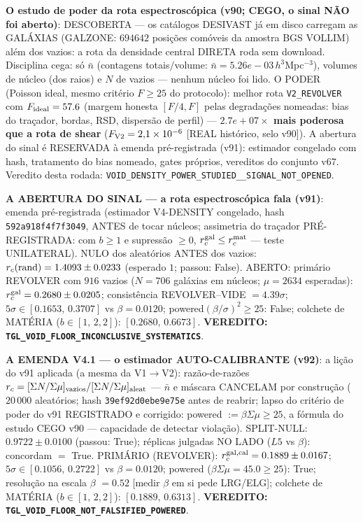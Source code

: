 \documentclass[11pt]{article}
\theoremstyle{definition}\newtheorem{deriv}{Derivação}
\begin{document}
\textbf{O estudo de poder da rota espectroscópica (v90; CEGO, o sinal NÃO foi aberto)}: DESCOBERTA --- os catálogos DESIVAST já em disco carregam as GALÁXIAS (GALZONE: $694642$ posições comóveis da amostra BGS VOLLIM) além dos vazios: a rota da densidade central DIRETA roda sem download. Disciplina cega: só $\bar n$ (contagens totais$/$volume: $\bar n=5.26e-03\,h^3$Mpc$^{-3}$), volumes de núcleo (dos raios) e $N$ de vazios --- nenhum núcleo foi lido. O PODER (Poisson ideal, mesmo critério $F\ge25$ do protocolo): melhor rota \texttt{V2\_REVOLVER} com $F_{\rm ideal}=57.6$ (margem honesta $[F/4,F]$ pelas degradações nomeadas: bias do traçador, bordas, RSD, dispersão de perfil) --- \textbf{$2.7e+07\times$ mais poderosa que a rota de shear} ($F_{\rm V2}=2{,}1\times10^{-6}$ [REAL histórico, selo v90]). A abertura do sinal é RESERVADA à emenda pré-registrada (v91): estimador congelado com hash, tratamento do bias nomeado, gates próprios, vereditos do conjunto v67. Veredito desta rodada: \texttt{VOID\_DENSITY\_POWER\_STUDIED\_\_SIGNAL\_NOT\_OPENED}.

\textbf{A ABERTURA DO SINAL --- a rota espectroscópica fala (v91)}: emenda pré-registrada (estimador V4-DENSITY congelado, hash \texttt{592a918f4f7f3049}, ANTES de tocar núcleos; assimetria do traçador PRÉ-REGISTRADA: com $b\ge1$ e supressão $\ge0$, $r_c^{\rm gal}\le r_c^{\rm mat}$ --- teste UNILATERAL). NULO dos aleatórios ANTES dos vazios: $r_c({\rm rand})=1.4093\pm0.0233$ (esperado $1$; passou: False). ABERTO: primário REVOLVER com $916$ vazios ($N=706$ galáxias em núcleos; $\mu=2634$ esperadas): $r_c^{\rm gal}=0.2680\pm0.0205$; consistência REVOLVER--VIDE $=4.39\sigma$; $5\sigma\in[0.1653,\,0.3707]$ vs $\beta=0.0120$; powered$(\beta/\sigma)^2\ge25$: False; colchete de MATÉRIA ($b\in[1,\,2{,}2]$): $[0.2680,\,0.6673]$. \textbf{VEREDITO: \texttt{TGL\_VOID\_FLOOR\_INCONCLUSIVE\_SYSTEMATICS}}.

\textbf{A EMENDA V4.1 --- o estimador AUTO-CALIBRANTE (v92)}: a lição do v91 aplicada (a mesma da V1$\to$V2): razão-de-razões $r_c=[\Sigma N/\Sigma\mu]_{\rm vazios}/[\Sigma N/\Sigma\mu]_{\rm aleat}$ --- $\bar n$ e máscara CANCELAM por construção ($20\,000$ aleatórios; hash \texttt{39ef92d0ebe9e75e} antes de reabrir; lapso do critério de poder do v91 REGISTRADO e corrigido: powered $:=\beta\Sigma\mu\ge25$, a fórmula do estudo CEGO v90 --- capacidade de detectar violação). SPLIT-NULL: $0.9722\pm0.0100$ (passou: True); réplicas julgadas NO LADO ($L5$ vs $\beta$): concordam $=$ True. PRIMÁRIO (REVOLVER): $r_c^{\rm gal,cal}=0.1889\pm0.0167$; $5\sigma\in[0.1056,\,0.2722]$ vs $\beta=0.0120$; powered ($\beta\Sigma\mu=45.0\ge25$): True; resolução na escala $\beta$ $=0.52$ [medir $\beta$ em si pede LRG/ELG]; colchete de MATÉRIA ($b\in[1,\,2{,}2]$): $[0.1889,\,0.6313]$. \textbf{VEREDITO: \texttt{TGL\_VOID\_FLOOR\_NOT\_FALSIFIED\_POWERED}}.
\end{document}

